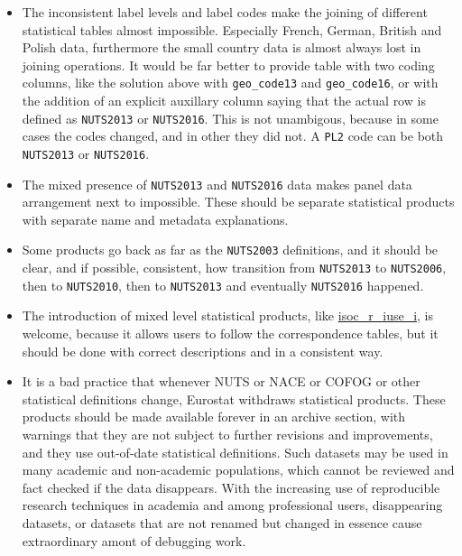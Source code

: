 \documentclass[]{article}
\begin{document}
\begin{itemize}
\item
  The inconsistent label levels and label codes make the joining of
  different statistical tables almost impossible. Especially French,
  German, British and Polish data, furthermore the small country data is
  almost always lost in joining operations. It would be far better to
  provide table with two coding columns, like the solution above with
  \texttt{geo\_code13} and \texttt{geo\_code16}, or with the addition of
  an explicit auxillary column saying that the actual row is defined as
  \texttt{NUTS2013} or \texttt{NUTS2016}. This is not unambigous,
  because in some cases the codes changed, and in other they did not. A
  \texttt{PL2} code can be both \texttt{NUTS2013} or \texttt{NUTS2016}.
\item
  The mixed presence of \texttt{NUTS2013} and \texttt{NUTS2016} data
  makes panel data arrangement next to impossible. These should be
  separate statistical products with separate name and metadata
  explanations.
\item
  Some products go back as far as the \texttt{NUTS2003} definitions, and
  it should be clear, and if possible, consistent, how transition from
  \texttt{NUTS2013} to \texttt{NUTS2006}, then to \texttt{NUTS2010},
  then to \texttt{NUTS2013} and eventually \texttt{NUTS2016} happened.
\item
  The introduction of mixed level statistical products, like
  \href{https://appsso.eurostat.ec.europa.eu/nui/show.do?dataset=isoc_r_iuse_i\&lang=en}{isoc\_r\_iuse\_i},
  is welcome, because it allows users to follow the correspondence
  tables, but it should be done with correct descriptions and in a
  consistent way.
\item
  It is a bad practice that whenever NUTS or NACE or COFOG or other
  statistical definitions change, Eurostat withdraws statistical
  products. These products should be made available forever in an
  archive section, with warnings that they are not subject to further
  revisions and improvements, and they use out-of-date statistical
  definitions. Such datasets may be used in many academic and
  non-academic populations, which cannot be reviewed and fact checked if
  the data disappears. With the increasing use of reproducible research
  techniques in academia and among professional users, disappearing
  datasets, or datasets that are not renamed but changed in essence
  cause extraordinary amont of debugging work.
\end{itemize}
\end{document}
